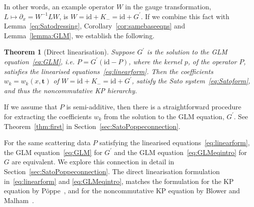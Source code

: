 \documentclass[5p,twocolumn]{elsarticle}
\newcommand*{\id}{{\mathrm{id}}}
\newcommand*{\pa}{{\partial}}
\newcommand*{\tbf}{\boldsymbol{t}}
\newtheorem{theorem}{Theorem}
\begin{document}
In other words, an example operator $W$ in the gauge transformation, $L\mapsto \pa_x=W^{-1} LW$, is $W=\id+K_-=\id+G^\prime$. 
If we combine this fact with Lemma~\ref{eq:Satodressing}, Corollary~\ref{cor:samebaseeqns} and Lemma~\ref{lemma:GLM}, we establish the following. 
%
\begin{theorem}[Direct linearisation]\label{thm:DLviadressing}
  Suppose $G^\prime$ is the solution to the GLM equation~\eqref{eq:GLM}, i.e.\/ $P=G^\prime(\id-P)$, where the kernel $p$, of the operator $P$, satisfies the linearised equations~\eqref{eq:linearform}.
  Then the coefficients $w_k=w_k(x,\tbf)$ of $W=\id+K_-=\id+G^\prime$, satisfy the Sato system~\eqref{eq:Satoform}, and thus the noncommutative KP hierarchy.
\end{theorem}
%
\begin{remark}\label{rmk:extractingwk}
If we assume that $P$ is semi-additive, then there is a straightforward procedure for extracting the coefficients $w_k$ from the solution to the GLM equation, $G^\prime$.
See Theorem~\ref{thm:first} in Section~\ref{sec:SatoPoppeconnection}.
\end{remark}
%
\begin{remark}\label{rmk:baseeqns}
  For the same scattering data $P$ satisfying the linearised equations~\eqref{eq:linearform}, the GLM equation~\eqref{eq:GLM} for $G^\prime$ and the GLM equation~\eqref{eq:GLMeqintro} for $G$ are equivalent.
  We explore this connection in detail in Section~\ref{sec:SatoPoppeconnection}.
  The direct linearisation formulation in~\eqref{eq:linearform} and \eqref{eq:GLMeqintro}, matches the formulation for the KP equation by P\"oppe~\cite{PKP},
  and for the noncommutative KP equation by Blower and Malham~\cite{BM-KP}.
\end{remark}
%
\end{document}
